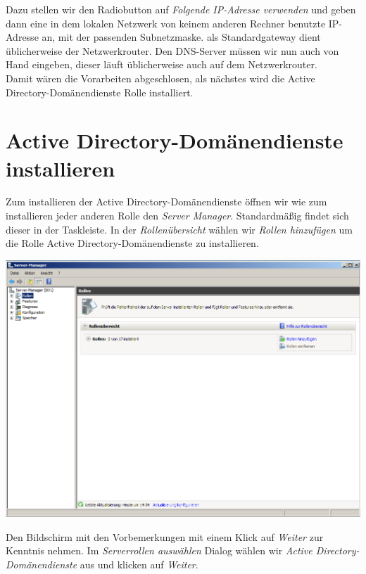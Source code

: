 \documentclass[12pt,a4paper,titlepage]{scrartcl} %
\begin{document}
Dazu stellen wir den Radiobutton auf \emph{Folgende IP-Adresse verwenden} und geben dann eine in dem lokalen Netzwerk von keinem anderen Rechner benutzte IP-Adresse an, mit der passenden Subnetzmaske. als Standardgateway dient üblicherweise der Netzwerkrouter. Den DNS-Server müssen wir nun auch von Hand eingeben, dieser läuft üblicherweise auch auf dem Netzwerkrouter.\\
Damit wären die Vorarbeiten abgeschlosen, als nächstes wird die Active Directory-Domänendienste Rolle installiert.

\newpage
\section{Active Directory-Domänendienste installieren}
Zum installieren der Active Directory-Domänendienste öffnen wir wie zum installieren jeder anderen Rolle den \emph{Server Manager}. Standardmäßig findet sich dieser in der Taskleiste. In der \emph{Rollenübersicht} wählen wir \emph{Rollen hinzufügen} um die Rolle Active Directory-Domänendienste zu installieren.\\

	\begin{center}\includegraphics[width=14cm]{Bilder/006}\\ \end{center}
	
Den Bildschirm mit den Vorbemerkungen mit einem Klick auf \emph{Weiter} zur Kenntnis nehmen. Im \emph{Serverrollen auswählen} Dialog wählen wir \emph{Active Directory-Domänendienste} aus und klicken auf \emph{Weiter}.\\
\end{document}
